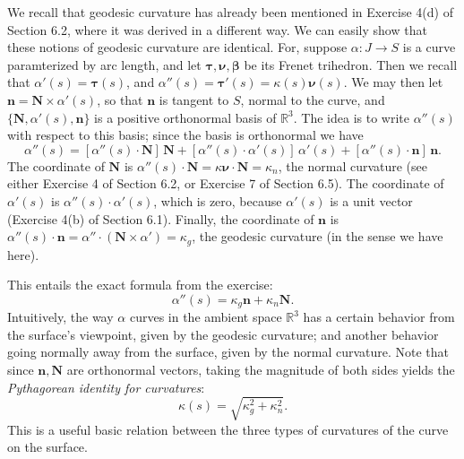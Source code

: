 \documentclass[leqno]{book}
\begin{document}
We recall that geodesic curvature has already been mentioned in Exercise 4(d) of Section 6.2, where it was derived in a different way.  We can easily show that these notions of geodesic curvature are identical.  For, suppose $\alpha:J\to S$ is a curve paramterized by arc length, and let $\boldsymbol\tau,\boldsymbol\nu,\boldsymbol\beta$ be its Frenet trihedron.  Then we recall that $\alpha'(s)=\boldsymbol\tau(s)$, and $\alpha''(s)=\boldsymbol\tau'(s)=\kappa(s)\boldsymbol\nu(s)$.  We may then let $\mathbf n=\mathbf N\times\alpha'(s)$, so that $\mathbf n$ is tangent to $S$, normal to the curve, and $\{\mathbf N,\alpha'(s),\mathbf n\}$ is a positive orthonormal basis of $\mathbb R^3$.  The idea is to write $\alpha''(s)$ with respect to this basis; since the basis is orthonormal we have
$$\alpha''(s)=\left[\alpha''(s)\cdot\mathbf N\right]\,\mathbf N+\left[\alpha''(s)\cdot\alpha'(s)\right]\,\alpha'(s)+\left[\alpha''(s)\cdot\mathbf n\right]\,\mathbf n.$$ %
The coordinate of $\mathbf N$ is $\alpha''(s)\cdot\mathbf N=\kappa\boldsymbol\nu\cdot\mathbf N=\kappa_n$, the normal curvature (see either Exercise 4 of Section 6.2, or Exercise 7 of Section 6.5).  The coordinate of $\alpha'(s)$ is $\alpha''(s)\cdot\alpha'(s)$, which is zero, because $\alpha'(s)$ is a unit vector (Exercise 4(b) of Section 6.1).  Finally, the coordinate of $\mathbf n$ is $\alpha''(s)\cdot\mathbf n=\alpha''\cdot(\mathbf N\times\alpha')=\kappa_g$, the geodesic curvature (in the sense we have here).

This entails the exact formula from the exercise:
$$\alpha''(s)=\kappa_g\mathbf n+\kappa_n\mathbf N.$$
Intuitively, the way $\alpha$ curves in the ambient space $\mathbb R^3$ has a certain behavior from the surface's viewpoint, given by the geodesic curvature; and another behavior going normally away from the surface, given by the normal curvature.  Note that since $\mathbf n,\mathbf N$ are orthonormal vectors, taking the magnitude of both sides yields the \emph{Pythagorean identity for curvatures}:
$$\kappa(s)=\sqrt{\kappa_g^2+\kappa_n^2}.$$
This is a useful basic relation between the three types of curvatures of the curve on the surface.\\
\end{document}
